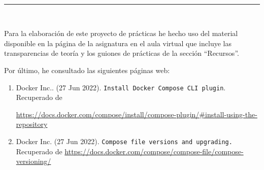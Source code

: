  \newpage
 \begin{center}
	{\fboxrule=4pt } \\
	\rule{15cm}{0pt} \\
\end{center}
\par Para la elaboración de este proyecto de prácticas he hecho uso del material disponible en la página de la asignatura en el aula virtual que incluye
las transparencias de teoría y los guiones de prácticas de la sección ``Recursos''.
\par Por último, he consultado las siguientes páginas web:
\begin{enumerate}
	\item Docker Inc.. (27 Jun 2022). \texttt{Install Docker Compose CLI plugin}. Recuperado de 
	\raggedright\url{https://docs.docker.com/compose/install/compose-plugin/#install-using-the-repository}
	\item Docker Inc. (27 Jun 2022). \texttt{Compose file versions and upgrading.} Recuperado de 
	\url{https://docs.docker.com/compose/compose-file/compose-versioning/}
\end{enumerate}

